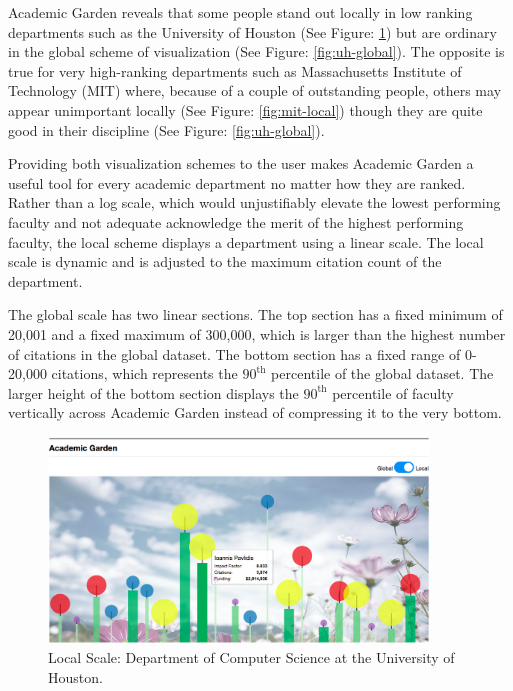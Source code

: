 Academic Garden reveals that some people stand out locally in low ranking departments such as the University of Houston (See Figure: \ref{fig:uh-local}) but are ordinary in the global scheme of visualization (See Figure: \ref{fig:uh-global}). The opposite is true for very high-ranking departments such as Massachusetts Institute of Technology (MIT) where, because of a couple of outstanding people, others may appear unimportant locally (See Figure: \ref{fig:mit-local}) though they are quite good in their discipline (See Figure: \ref{fig:uh-global}).

Providing both visualization schemes to the user makes Academic Garden a useful tool for every academic department no matter how they are ranked. 
Rather than a log scale, which would unjustifiably elevate the lowest performing faculty and not adequate acknowledge the merit of the highest performing faculty, the local scheme displays a department using a linear scale. The local scale is dynamic and is adjusted to the maximum citation count of the department.

The global scale has two linear sections. The top section has a fixed minimum of 20,001 and a fixed maximum of 300,000, which is larger than the highest number of citations in the global dataset. The bottom section has a fixed range of 0-20,000 citations, which represents the $90^{\text{th}}$ percentile of the global dataset. The larger height of the bottom section displays the $90^{\text{th}}$ percentile of faculty vertically across Academic Garden instead of compressing it to the very bottom.

\begin{figure}[H]
    \centering
    \includegraphics[width=0.9\textwidth]{figures/fig-UH-Local}
    \caption{Local Scale: Department of Computer Science at the University of Houston.}
    \label{fig:uh-local}
\end{figure}

